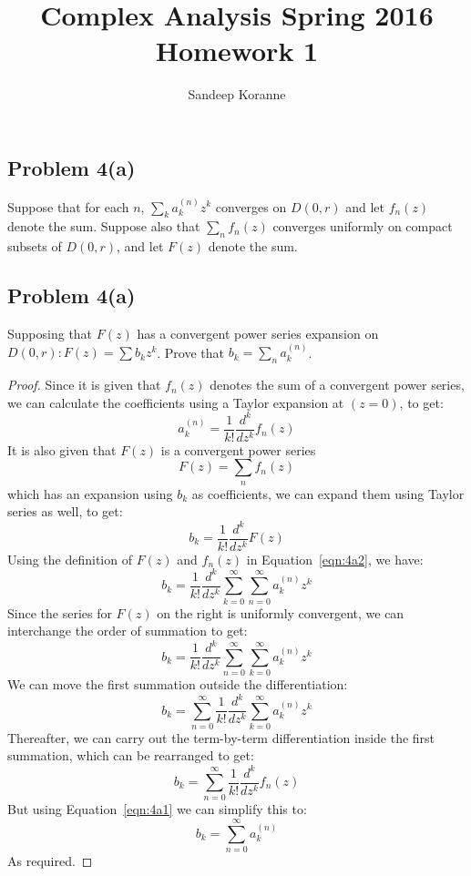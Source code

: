 \documentclass{article}[12pt]
\newtheorem{proof}{Proof}
\begin{document}
\title{Complex Analysis Spring 2016 Homework 1}
\author{Sandeep Koranne}
\date{}

\subsection*{Problem 4(a)}
Suppose that for each $n$, $\sum_k a_k^{(n)}z^k$ converges on $D(0,r)$ and let
$f_n(z)$ denote the sum. Suppose also that $\sum_n f_n(z)$ converges uniformly
on compact subsets of $D(0,r)$, and let $F(z)$ denote the sum.
\subsection{Problem 4(a)}
Supposing that $F(z)$ has a convergent power series expansion on
$D(0,r): F(z) = \sum b_kz^k$. Prove that $b_k=\sum_n a_k^{(n)}$.
\begin{proof}
Since it is given that $f_n(z)$ denotes the sum of a convergent
power series, we can calculate the coefficients using a Taylor expansion
at $(z=0)$,
to get:
\begin{equation}
a^{(n)}_k = \frac{1}{k!} \frac{d^k}{dz^k}f_n(z) \label{eqn:4a1}
\end{equation}
It is also given that $F(z)$ is a convergent power series
\[
F(z) = \sum_n f_n(z)
\]
which has an expansion using $b_k$ as coefficients, we can expand them
using Taylor series as well, to get:
\begin{equation}
b_k = \frac{1}{k!} \frac{d^k}{dz^k}F(z) \label{eqn:4a2}
\end{equation}
Using the definition of $F(z)$ and $f_n(z)$ 
in Equation~\ref{eqn:4a2}, we have:
\begin{equation}
b_k = \frac{1}{k!} \frac{d^k}{dz^k}\sum_{k=0}^\infty \sum_{n=0}^\infty a^{(n)}_kz^k
\label{eqn:4a3}
\end{equation}
Since the series for $F(z)$ on the right is uniformly convergent, 
we can interchange the order of summation to get:
\[
b_k = \frac{1}{k!} \frac{d^k}{dz^k} \sum_{n=0}^\infty  \sum_{k=0}^\infty a^{(n)}_kz^k
\]
We can move the first summation outside the differentiation:
\[
b_k = \sum_{n=0}^\infty \frac{1}{k!} \frac{d^k}{dz^k} \sum_{k=0}^\infty a^{(n)}_kz^k
\]
Thereafter, we can carry out the term-by-term differentiation inside the
first summation, which can be rearranged to get:
\[
b_k = \sum_{n=0}^\infty \frac{1}{k!} \frac{d^k}{dz^k} f_n(z)
\]
But using Equation~\ref{eqn:4a1} we can simplify this to:
\[
b_k = \sum_{n=0}^\infty a^{(n)}_k
\]
As required.
\end{proof}
\end{document}
